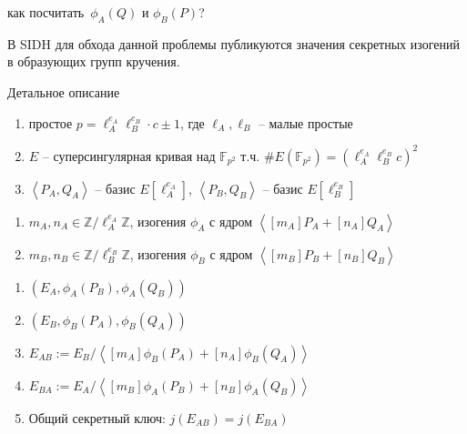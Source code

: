 \documentclass{beamer}
\begin{document}
\begin{frame}
	 как посчитать~$\phi_A(Q)$ и $\phi_B(P)$?
	\vspace{1em}
	
	В SIDH для обхода данной проблемы публикуются значения секретных изогений в образующих групп кручения.
\end{frame}

\begin{frame}{Детальное описание}
	\begin{enumerate}
		\item простое
		$p = \ell_A^{e_A} \ell_B^{e_B} \cdot c \pm 1$, где $\ell_A, \ell_B$ -- малые простые
		\item $E$ -- суперсингулярная кривая над $\mathbb{F}_{p^2}$ т.ч. $\#E(\mathbb{F}_{p^2}) = (\ell_A^{e_A} \ell_{B}^{e_B} c)^2$
		\item $\left<P_A, Q_A\right>$ -- базис $E[\ell_A^{e_A}]$, $\left<P_B, Q_B\right>$ -- базис $E[\ell_B^{e_B}]$
	\end{enumerate}
	\vspace*{1em}
	\begin{enumerate}
		\item[\structure{{\Large\faUserSecret}}] $m_A, n_A \in \mathbb{Z}/\ell_A^{e_A} \mathbb{Z}$, изогения $\phi_A$ с ядром $\left< [m_A]P_A + [n_A]Q_A \right>$
		\item[\structure{{\Large\faCat}}] $m_B, n_B \in \mathbb{Z}/\ell_B^{e_B} \mathbb{Z}$, изогения $\phi_B$ с ядром $\left< [m_B]P_B + [n_B]Q_B \right>$
	\end{enumerate}
\end{frame}

\begin{frame}
	\begin{enumerate}
		\item
		\structure{{\Large\faUserSecret}} \structure{$\implies$} \structure{{\Large\faCat}:} $(E_A, \phi_A(P_B), \phi_A(Q_B))$
		\item
		\structure{{\Large\faCat}} \structure{$\implies$} \structure{{\Large\faUserSecret}:} $(E_B, \phi_B(P_A), \phi_B(Q_A))$
		\item \structure{{\Large\faUserSecret}:} $E_{AB} := E_B/\left< [m_A]\phi_B(P_A) + [n_A]\phi_B(Q_A) \right>$
		\item \structure{{\Large\faCat}:} $E_{BA} := E_A/\left< [m_B]\phi_A(P_B) + [n_B]\phi_A(Q_B) \right>$
		\item Общий секретный ключ: $j(E_{AB}) = j(E_{BA})$
	\end{enumerate}
\end{frame}
\end{document}
